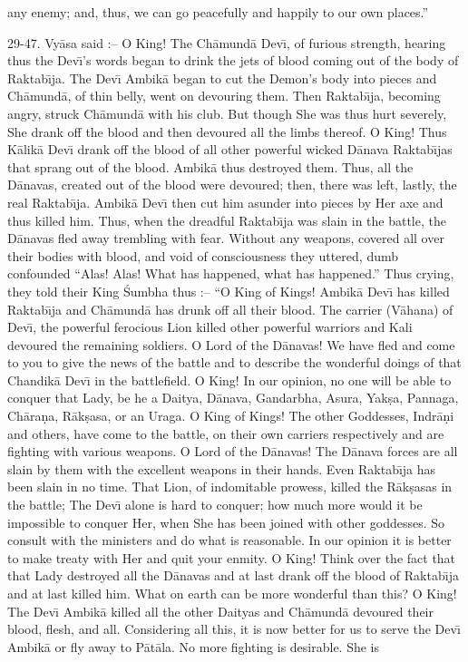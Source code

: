 any enemy; and, thus, we can go peacefully and happily to our own places.''

29-47. Vy\=asa said :-- O King! The Ch\=amund\=a Dev\={\i}, of furious strength, hearing thus the Dev\={\i}'s words began to drink the jets of blood coming out of the body of Raktab\={\i}ja. The Dev\={\i} Ambik\=a began to cut the Demon's body into pieces and Ch\=amund\=a, of thin belly, went on devouring them. Then Raktab\={\i}ja, becoming angry, struck Ch\=amund\=a with his club. But though She was thus hurt severely, She drank off the blood and then devoured all the limbs thereof. O King! Thus K\=alik\=a Dev\={\i} drank off the blood of all other powerful wicked D\=anava Raktab\={\i}jas that sprang out of the blood. Ambik\=a thus destroyed them. Thus, all the D\=anavas, created out of the blood were devoured; then, there was left, lastly, the real Raktab\={\i}ja. Ambik\=a Dev\={\i} then cut him asunder into pieces by Her axe and thus killed him. Thus, when the dreadful Raktab\={\i}ja was slain in the battle, the D\=anavas fled away trembling with fear. Without any weapons, covered all over their bodies with blood, and void of consciousness they uttered, dumb confounded ``Alas! Alas! What has happened, what has happened.'' Thus crying, they told their King \'Sumbha thus :-- ``O King of Kings! Ambik\=a Dev\={\i} has killed Raktab\={\i}ja and Ch\=amund\=a has drunk off all their blood. The carrier (V\=ahana) of Dev\={\i}, the powerful ferocious Lion killed other powerful warriors and Kali devoured the remaining soldiers. O Lord of the D\=anavas! We have fled and come to you to give the news of the battle and to describe the wonderful doings of that Chandik\=a Dev\={\i} in the battlefield. O King! In our opinion, no one will be able to conquer that Lady, be he a Daitya, D\=anava, Gandarbha, Asura, Yak\d{s}a, Pannaga, Ch\=ara\d{n}a, R\=ak\d{s}asa, or an Uraga. O King of Kings! The other Goddesses, Indr\=a\d{n}i and others, have come to the battle, on their own carriers respectively and are fighting with various weapons. O Lord of the D\=anavas! The D\=anava forces are all slain by them with the excellent weapons in their hands. Even Raktab\={\i}ja has been slain in no time. That Lion, of indomitable prowess, killed the R\=ak\d{s}asas in the battle; The Dev\={\i} alone is hard to conquer; how much more would it be impossible to conquer Her, when She has been joined with other goddesses. So consult with the ministers and do what is reasonable. In our opinion it is better to make treaty with Her and quit your enmity. O King! Think over the fact that that Lady destroyed all the D\=anavas and at last drank off the blood of Raktab\={\i}ja and at last killed him. What on earth can be more wonderful than this? O King! The Dev\={\i} Ambik\=a killed all the other Daityas and Ch\=amund\=a devoured their blood, flesh, and all. Considering all this, it is now better for us to serve the Dev\={\i} Ambik\=a or fly away to P\=at\=ala. No more fighting is desirable. She is

